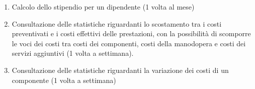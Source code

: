 \begin{enumerate}
			\item \label{op:calc_stipendio_operatore}Calcolo dello stipendio per un dipendente (1 volta al mese)
			\item \label{op:stats_prevetivi_prestazioni}Consultazione delle statistiche riguardanti lo scostamento tra i costi preventivati e i costi effettivi delle prestazioni, con la possibilità di scomporre le voci dei costi tra costi dei componenti, costi della manodopera e costi dei servizi aggiuntivi (1 volta a settimana).
			\item \label{op:stats_costi}Consultazione delle statistiche riguardanti la variazione dei costi di un componente (1 volta a settimana)
			
		\end{enumerate}
